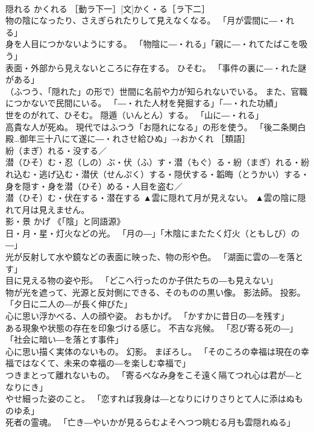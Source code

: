 \documentclass[8pt]{extreport}
\begin{document}
\begin{CJK}{UTF8}{min}
\\	隠れる	かくれる	［動ラ下一］[文]かく・る［ラ下二］ 
\\	物の陰になったり、さえぎられたりして見えなくなる。 「月が雲間に―・れる」 
\\	身を人目につかないようにする。 「物陰に―・れる」「親に―・れてたばこを吸う」 
\\	表面・外部から見えないところに存在する。 ひそむ。 「事件の裏に―・れた謎がある」 
\\	（ふつう、「隠れた」の形で）世間に名前や力が知られないでいる。 また、官職につかないで民間にいる。 「―・れた人材を発掘する」「―・れた功績」 
\\	世をのがれて、ひそむ。 隠遁（いんとん）する。 「山に―・れる」 
\\	高貴な人が死ぬ。 現代ではふつう「お隠れになる」の形を使う。 「後二条関白殿…御年三十八にて遂に―・れさせ給ひぬ」→おかくれ ［類語］
\\	紛（まぎ）れる・没する／
\\	潜（ひそ）む・忍（しの）ぶ・伏（ふ）す・潜（もぐ）る・紛（まぎ）れる・紛れ込む・逃げ込む・潜伏（せんぷく）する・隠伏する・韜晦（とうかい）する・身を隠す・身を潜（ひそ）める・人目を盗む／
\\	潜（ひそ）む・伏在する・潜在する	▲雲に隠れて月が見えない。 ▲雲の陰に隠れて月は見えません。
\\	影・景	かげ	《「陰」と同語源》 
\\	日・月・星・灯火などの光。 「月の―」「木陰にまたたく灯火（ともしび）の―」 
\\	光が反射して水や鏡などの表面に映った、物の形や色。 「湖面に雲の―を落とす」 
\\	目に見える物の姿や形。 「どこへ行ったのか子供たちの―も見えない」 
\\	物が光を遮って、光源と反対側にできる、そのものの黒い像。 影法師。 投影。 「夕日に二人の―が長く伸びた」 
\\	心に思い浮かべる、人の顔や姿。 おもかげ。 「かすかに昔日の―を残す」 
\\	ある現象や状態の存在を印象づける感じ。 不吉な兆候。 「忍び寄る死の―」「社会に暗い―を落とす事件」 
\\	心に思い描く実体のないもの。 幻影。 まぼろし。 「そのころの幸福は現在の幸福ではなくて、未来の幸福の―を楽しむ幸福で」 
\\	つきまとって離れないもの。 「寄るべなみ身をこそ遠く隔てつれ心は君が―となりにき」 
\\	やせ細った姿のこと。 「恋すれば我身は―となりにけりさりとて人に添はぬものゆゑ」 
\\	死者の霊魂。 「亡き―やいかが見るらむよそへつつ眺むる月も雲隠れぬる」 

\end{CJK}
\end{document}
